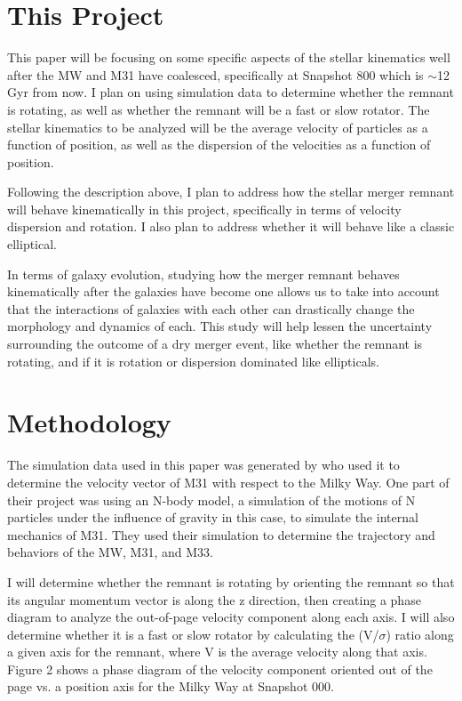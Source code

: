 \documentclass[twocolumn]{aastex63}
\begin{document}
\section{This Project} \label{sec:style}

This paper will be focusing on some specific aspects of the stellar kinematics well after the MW and M31 have coalesced, specifically at Snapshot 800 which is $\sim$12 Gyr from now.  I plan on using simulation data to determine whether the remnant is rotating, as well as whether the remnant will be a fast or slow rotator.  The stellar kinematics to be analyzed will be the average velocity of particles as a function of position, as well as the dispersion of the velocities as a function of position.

Following the description above, I plan to address how the stellar merger remnant will behave kinematically in this project, specifically in terms of velocity dispersion and rotation.  I also plan to address whether it will behave like a classic elliptical.  

In terms of galaxy evolution, studying how the merger remnant behaves kinematically after the galaxies have become one allows us to take into account that the interactions of galaxies with each other can drastically change the morphology and dynamics of each. This study will help lessen the uncertainty surrounding the outcome of a dry merger event, like whether the remnant is rotating, and if it is rotation or dispersion dominated like ellipticals.  

\section{Methodology} \label{sec:style}

The simulation data used in this paper was generated by \cite{2012ApJ...753....8V} who used it to determine the velocity vector of M31 with respect to the Milky Way.  One part of their project was using an N-body model, a simulation of the motions of N particles under the influence of gravity in this case, to simulate the internal mechanics of M31. They used their simulation to determine the trajectory and behaviors of the MW, M31, and M33.        

I will determine whether the remnant is rotating by orienting the remnant so that its angular momentum vector is along the z direction, then creating a phase diagram to analyze the out-of-page velocity component along each axis.  I will also determine whether it is a fast or slow rotator by calculating the (V/$\sigma$) ratio along a given axis for the remnant, where V is the average velocity along that axis.  Figure 2 shows a phase diagram of the velocity component oriented out of the page vs. a position axis for the Milky Way at Snapshot 000.    
\end{document}
